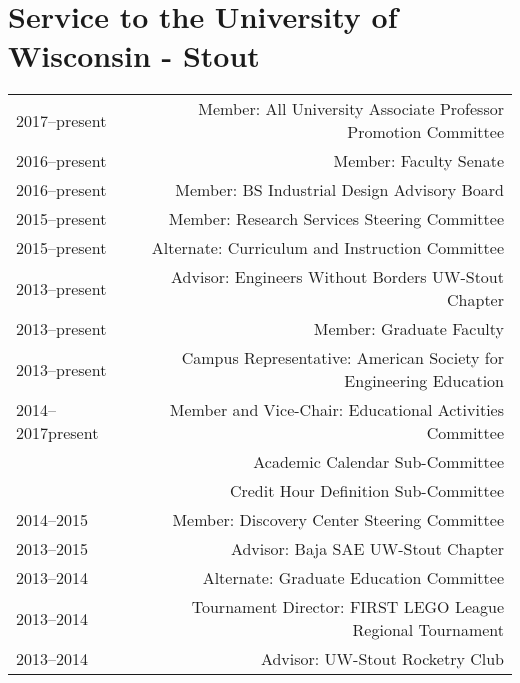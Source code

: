 \section*{Service to the University of Wisconsin - Stout}
\begin{tabular}{L!{\VRule}R}
2017--present&Member: All University Associate Professor Promotion Committee\\
2016--present&Member: Faculty Senate\\
2016--present&Member: BS Industrial Design Advisory Board\\
2015--present&Member: Research Services Steering Committee \\
2015--present&Alternate: Curriculum and Instruction Committee \\
2013--present&Advisor: Engineers Without Borders UW-Stout Chapter \\
2013--present&Member: Graduate Faculty \\
2013--present&Campus Representative: American Society for Engineering Education\\
2014--2017present&Member and Vice-Chair: Educational Activities Committee \\
 &Academic Calendar Sub-Committee \\
 &Credit Hour Definition Sub-Committee \\
2014--2015&Member: Discovery Center Steering Committee \\
2013--2015&Advisor: Baja SAE UW-Stout Chapter \\
2013--2014&Alternate: Graduate Education Committee \\
2013--2014&Tournament Director: FIRST LEGO League Regional Tournament\\
2013--2014&Advisor: UW-Stout Rocketry Club\\
\end{tabular}